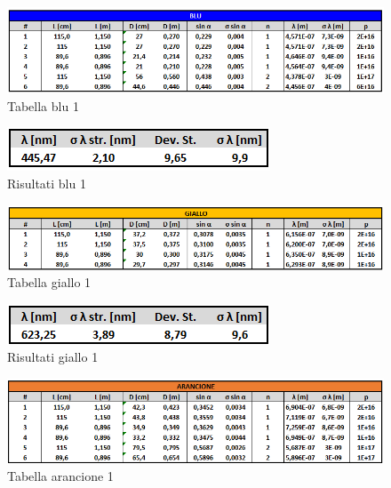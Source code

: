 \documentclass{article}
\begin{document}
\begin{figure}[h!]
  \centering
  \includegraphics[width=1\linewidth]{IM tabella blu 1}
  \caption{Tabella blu 1}
\end{figure}

\begin{figure}[h!]
  \centering
  \includegraphics[width=0.4\linewidth]{IM risultati blu 1}
  \caption{Risultati blu 1}
\end{figure}

\begin{figure}[h!]
  \centering
  \includegraphics[width=1\linewidth]{IM tabella giallo 1}
  \caption{Tabella giallo 1}
\end{figure}

\begin{figure}[h!]
  \centering
  \includegraphics[width=0.4\linewidth]{IM risultati giallo 1}
  \caption{Risultati giallo 1}
\end{figure}

\begin{figure}[h!]
  \centering
  \includegraphics[width=1\linewidth]{IM tabella arancio 1}
  \caption{Tabella arancione 1}
\end{figure}
\end{document}
